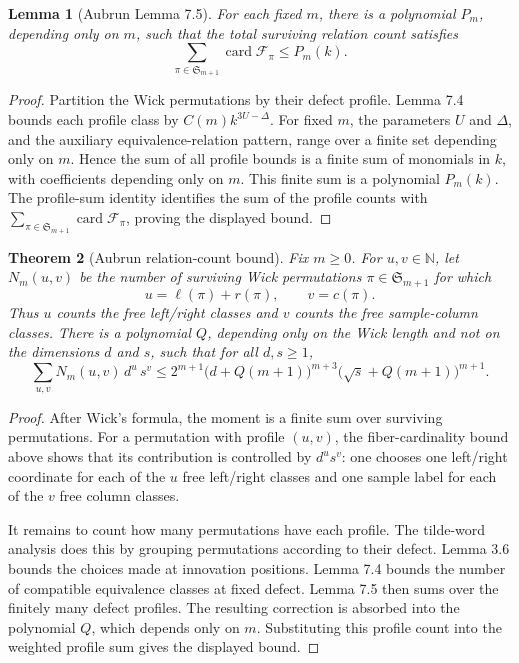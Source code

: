 \documentclass[11pt,oneside]{book}
\newtheorem{theorem}{Theorem}[chapter]
\newtheorem{lemma}[theorem]{Lemma}
\DeclareMathOperator{\card}{card}
\newcommand{\N}{\mathbb N}
\newcommand{\1}{\mathbf 1}
\begin{document}
\begin{lemma}[Aubrun Lemma 7.5]
For each fixed \(m\), there is a polynomial \(P_m\), depending only on \(m\),
such that the total surviving relation count satisfies
\[
  \sum_{\pi\in\mathfrak S_{m+1}}\card\mathcal F_\pi
  \le P_m(k).
\]
\end{lemma}

\begin{proof}
Partition the Wick permutations by their defect profile.  Lemma 7.4 bounds
each profile class by \(C(m)k^{3U-\Delta}\).  For fixed \(m\), the parameters
\(U\) and \(\Delta\), and the auxiliary equivalence-relation pattern, range
over a finite set depending only on \(m\).  Hence the sum of all profile
bounds is a finite sum of monomials in \(k\), with coefficients depending only
on \(m\).  This finite sum is a polynomial \(P_m(k)\).  The profile-sum
identity identifies the sum of the profile counts with
\(\sum_{\pi\in\mathfrak S_{m+1}}\card\mathcal F_\pi\), proving the displayed
bound.
\end{proof}

\begin{theorem}[Aubrun relation-count bound]
Fix \(m\ge0\).  For \(u,v\in\N\), let \(N_m(u,v)\) be the number of surviving
Wick permutations \(\pi\in\mathfrak S_{m+1}\) for which
\[
  u=\ell(\pi)+r(\pi),
  \qquad
  v=c(\pi).
\]
Thus \(u\) counts the free left/right classes and \(v\) counts the free
sample-column classes.  There is a polynomial \(Q\), depending only on the
Wick length and not on the dimensions \(d\) and \(s\), such that for all
\(d,s\ge1\),
\[
  \sum_{u,v} N_m(u,v)\,d^u\,s^v
  \le
  2^{m+1}
  \bigl(d+Q(m+1)\bigr)^{m+3}
  \bigl(\sqrt s+Q(m+1)\bigr)^{m+1}.
\]
\end{theorem}

\begin{proof}
After Wick's formula, the moment is a finite sum over surviving permutations.
For a permutation with profile \((u,v)\), the fiber-cardinality bound above
shows that its contribution is controlled by \(d^u s^v\): one chooses one
left/right coordinate for each of the \(u\) free left/right classes and one
sample label for each of the \(v\) free column classes.

It remains to count how many permutations have each profile.  The tilde-word
analysis does this by grouping permutations according to their defect.  Lemma
3.6 bounds the choices made at innovation positions.  Lemma 7.4 bounds the
number of compatible equivalence classes at fixed defect.  Lemma 7.5 then sums
over the finitely many defect profiles.  The resulting correction is absorbed
into the polynomial \(Q\), which depends only on \(m\).  Substituting this
profile count into the weighted profile sum gives the displayed bound.
\end{proof}
\end{document}
